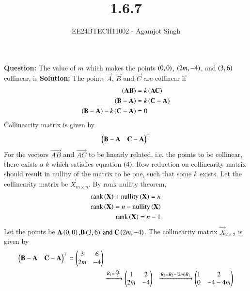 \documentclass[journal]{IEEEtran}
\begin{document}

\vspace{3cm}

\title{1.6.7}
\author{EE24BTECH11002 - Agamjot Singh
}
{\let\newpage\relax\maketitle}

\renewcommand{\thefigure}{\theenumi}
\renewcommand{\thetable}{\theenumi}
\setlength{\intextsep}{10pt} %

\textbf{Question:}
\newline
The value of $m$ which makes the points $\left(0, 0\right)$, $\left(2m, -4\right)$, and $\left(3,6\right)$ collinear, is
\newline
\textbf{Solution:}
\newline
The points $\vec{A}$, $\vec{B}$ and $\vec{C}$ are collinear if
\begin{align}
	\left(\mathbf{AB}\right) &= k\left(\mathbf{AC}\right)\\
	\left(\mathbf{B} - \mathbf{A}\right) &= k\left(\mathbf{C} - \mathbf{A}\right)\\
	\left(\mathbf{B} - \mathbf{A}\right) - k\left(\mathbf{C} - \mathbf{A}\right) &= 0
\end{align}
Collinearity matrix is given by
\begin{align}
	\begin{pmatrix}\mathbf{B} - \mathbf{A} & \mathbf{C} - \mathbf{A}\end{pmatrix}^\top 
\end{align}
For the vectors $\vec{AB}$ and $\vec{AC}$ to be linearly related, i.e. the points to be collinear, there exists a $k$ which satisfies equation $\left(4\right)$.
\newline
Row reduction on collinearity matrix should result in nullity of the matrix to be one, such that some $k$ exists.
\newline
Let the collinearity matrix be $\vec{X}_{m\times n}$.
By rank nullity theorem,
\begin{align}
	\text{rank}\left(\mathbf{X}\right) + \text{nullity}\left(\mathbf{X}\right) = n\\
	\text{rank}\left(\mathbf{X}\right) = n - \text{nullity}\left(\mathbf{X}\right)\\
	\text{rank}\left(\mathbf{X}\right) = n - 1
\end{align}
\newline
Let the points be $\mathbf{A}\left(0, 0\right) \text{,} \mathbf{B}\left(3, 6\right) \text{ and } \mathbf{C}\left(2m, -4\right)$.
The collinearity matrix $\vec{X}_{2\times 2}$ is given by
\begin{align}
	\begin{pmatrix}\mathbf{B} - \mathbf{A} & \mathbf{C} - \mathbf{A}\end{pmatrix}^\top = \begin{pmatrix}3 & 6 \\ 2m & -4\end{pmatrix}\\ 
													   &\xrightarrow{R_1 = \frac{R_1}{2}} \begin{pmatrix}1 & 2\\2m & -4\end{pmatrix}
													   &\xrightarrow{R_2 = R_2 - \left(2m\right)R_1} \begin{pmatrix}1 & 2\\0 & -4-4m\end{pmatrix}
\end{align}
\end{document}
